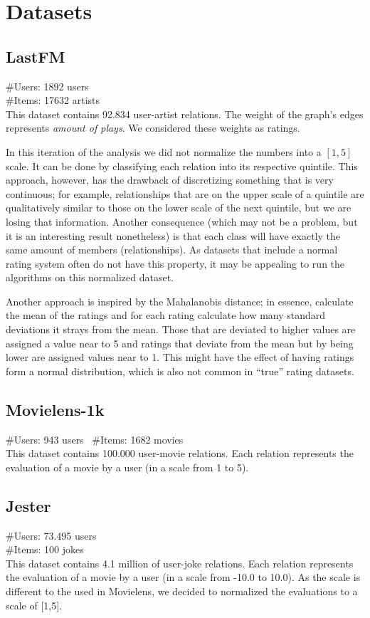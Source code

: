 \documentclass[a4paper]{article}
\begin{document}
\section{Datasets}
\subsection{LastFM}
\#Users: 1892 users \\
\#Items: 17632 artists \\
This dataset contains 92.834 user-artist relations. The weight of the graph's edges represents \textit{amount of plays}. We considered these weights as ratings.

In this iteration of the analysis we did not normalize the numbers into a $[1,5]$ scale. It can be done by classifying each relation into its respective quintile. This approach, however, has the drawback of discretizing something that is very continuous; for example, relationships that are on the upper scale of a quintile are qualitatively similar to those on the lower scale of the next quintile, but we are losing that information. Another consequence (which may not be a problem, but it is an interesting result nonetheless) is that each class will have exactly the same amount of members (relationships). As datasets that include a normal rating system often do not have this property, it may be appealing to run the algorithms on this normalized dataset.   

Another approach is inspired by the Mahalanobis distance; in essence, calculate the mean of the ratings and for each rating calculate how many standard deviations it strays from the mean. Those that are deviated to higher values are assigned a value near to 5 and ratings that deviate from the mean but by being lower are assigned values near to 1. This might have the effect of having ratings form a normal distribution, which is also not common in ``true'' rating datasets.

\subsection{Movielens-1k}
\#Users: 943 users \
\#Items: 1682  movies \\
This dataset contains 100.000 user-movie relations. Each relation represents the evaluation of a movie by a user (in a scale from 1 to 5).

\subsection{Jester}
\#Users: 73.495 users \\
\#Items: 100 jokes \\
This dataset contains 4.1 million of user-joke relations. Each relation represents the evaluation of a movie by a user (in a scale from -10.0 to 10.0). As the scale is different to the used in Movielens, we decided to normalized the evaluations to a scale of [1,5]. 
\end{document}
